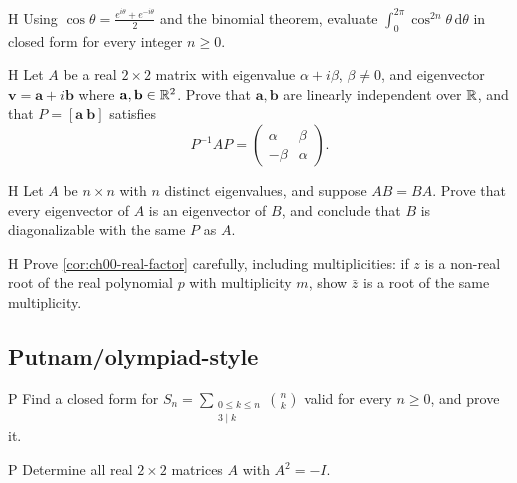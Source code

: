 \begin{problem}{H}\label{prob:ch00-h2}
Using $\cos\theta = \frac{e^{i\theta} + e^{-i\theta}}{2}$ and the binomial
theorem, evaluate $\displaystyle\int_0^{2\pi}\cos^{2n}\theta\,\mathrm{d}\theta$
in closed form for every integer $n\ge 0$.
\end{problem}

\begin{problem}{H}\label{prob:ch00-h3}
Let $A$ be a real $2\times 2$ matrix with eigenvalue $\alpha + i\beta$,
$\beta\neq 0$, and eigenvector $\mathbf v = \mathbf a + i\mathbf b$ where
$\mathbf a,\mathbf b\in\mathbb{R}^2$. Prove that $\mathbf a,\mathbf b$ are linearly
independent over $\mathbb{R}$, and that $P = [\mathbf a\ \mathbf b]$ satisfies
\[
  P^{-1}AP = \begin{pmatrix}\alpha&\beta\\-\beta&\alpha\end{pmatrix}.
\]
\end{problem}

\begin{problem}{H}\label{prob:ch00-h4}
Let $A$ be $n\times n$ with $n$ distinct eigenvalues, and suppose $AB = BA$.
Prove that every eigenvector of $A$ is an eigenvector of $B$, and conclude that
$B$ is diagonalizable with the same $P$ as $A$.
\end{problem}

\begin{problem}{H}\label{prob:ch00-h5}
Prove \cref{cor:ch00-real-factor} carefully, including multiplicities: if $z$
is a non-real root of the real polynomial $p$ with multiplicity $m$, show
$\bar z$ is a root of the same multiplicity.
\end{problem}

\subsection*{Putnam/olympiad-style}

\begin{problem}{P}\label{prob:ch00-p1}
Find a closed form for $\displaystyle S_n = \sum_{\substack{0\le k\le n\\ 3\mid k}}\binom{n}{k}$
valid for every $n\ge 0$, and prove it.
\end{problem}

\begin{problem}{P}\label{prob:ch00-p2}
Determine all real $2\times 2$ matrices $A$ with $A^2 = -I$.
\end{problem}

